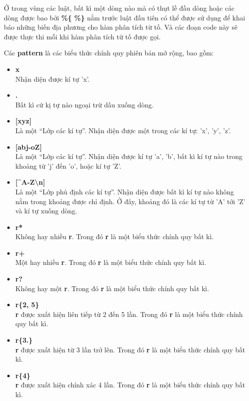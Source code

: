 \documentclass[../report.tex]{subfiles}
\begin{document}
Ở trong vùng các luật, bất kì một dòng nào mà có thụt lề đầu dòng
hoặc các dòng được bao bởi \textbf{\%\{ \%\}} nằm trước luật đầu tiên 
có thể được sử dụng để khai báo những biến địa phương cho 
hàm phân tích từ tố. Và các đoạn code này sẽ được thực thi mỗi 
khi hàm phân tích từ tố được gọi. 

Các \textbf{pattern} là các biểu thức chính quy phiên bản mở rộng, bao gồm:
\begin{itemize}
\item \textbf{x} \\
    Nhận diện được kí tự 'x'.
\item \textbf{.} \\
    Bất kì cứ kị tự nào ngoại trừ dấu xuống dòng. 
\item \textbf{[xyz]} \\
    Là một ``Lớp các kí tự''. Nhận diện được một trong các kí tự: 'x', 'y', 'z'.
\item \textbf{[abj-oZ]} \\
    Là một ``Lớp các kí tự''. Nhận diện được kí tự 'a', 'b', bất kì kí tự nào 
    trong khoảng từ 'j' đến 'o', hoặc kí tự 'Z'.
\item \textbf{[\textasciicircum A-Z\textbackslash n]} \\
    Là một ``Lớp phủ định các kí tự''. Nhận diện được bất kì kí tự nào không nằm trong khoảng 
    được chỉ định. Ở đây, khoảng đó là các kí tự từ 'A' tới 'Z' và kí tự xuống dòng. 
\item \textbf{r*} \\
    Không hay nhiều \textbf{r}. Trong đó \textbf{r} là một biểu thức chính quy bất kì. 
\item \textbf{r+} \\
    Một hay nhiều \textbf{r}. Trong đó \textbf{r} là một biểu thức chính quy bất kì. 
\item \textbf{r?} \\
    Không hay một \textbf{r}. Trong đó \textbf{r} là một biểu thức chính quy bất kì. 
\item \textbf{r\{2, 5\}} \\
    \textbf{r} được xuất hiện liên tiếp từ 2 đến 5 lần. Trong đó \textbf{r} là một biểu thức chính quy bất kì. 
\item \textbf{r\{3.\}} \\
    \textbf{r} được xuất hiện từ 3 lần trở lên. Trong đó \textbf{r} là một biểu thức chính quy bất kì. 
\item \textbf{r\{4\}} \\
    \textbf{r} được xuất hiện chính xác 4 lần. Trong đó \textbf{r} là một biểu thức chính quy bất kì. 

\end{itemize}
\end{document}
